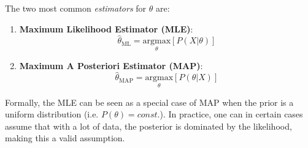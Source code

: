 \documentclass{article}
\begin{document}
The two most common \emph{estimators} for $\theta$ are:
\begin{enumerate}
    \item \textbf{Maximum Likelihood Estimator (MLE)}:
        \begin{equation*}
            \hat{\theta}_{\text{ML}}
            =
            \underset{\theta}{\text{argmax}} \left[ P(X|\theta) \right]
        \end{equation*}
    \item \textbf{Maximum A Posteriori Estimator (MAP)}:
        \begin{equation*}
            \hat{\theta}_{\text{MAP}}
            =
            \underset{\theta}{\text{argmax}} \left[ P(\theta|X) \right]
        \end{equation*}
\end{enumerate}
Formally, the MLE can be seen as a special case of MAP when the prior is a uniform distribution (i.e. $P(\theta) = const.$). In practice, one can in certain cases assume that with a lot of data, the posterior is dominated by the likelihood, making this a valid assumption.
\end{document}

